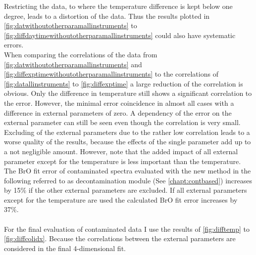 \documentclass  [
  paper    = a4,
  BCOR     = 10mm,
  twoside,
  fontsize = 12pt,
  fleqn,
  toc      = bibnumbered,
  toc      = listofnumbered,
  numbers  = noendperiod,
  headings = normal,
  listof   = leveldown,
  version  = 3.03
]                                       {scrreprt}
\begin{document}
Restricting the data, to where the temperature difference is kept below one degree, leads to a distortion of the data. Thus the results plotted in \cref{fig:datwithoutotherparamallinstruments} to \cref{fig:diffdaytimewithoutotherparamallinstruments} could also have systematic errors.\\
When comparing the correlations of the data from \cref{fig:datwithoutotherparamallinstruments} and \cref{fig:diffexptimewithoutotherparamallinstruments}  to the correlations of 
\cref{fig:datallinstruments} to \cref{fig:diffexptime} a large reduction of the correlation is obvious. Only the difference in temperature still shows a significant correlation to the   error. However, the minimal   error coincidence in almost all cases with a difference in external parameters of zero. A dependency of the   error on the external parameter can still be seen even though the correlation is very small. \\
Excluding of the external parameters due to the rather low correlation leads to a worse quality of the results, because the effects of the single parameter add up to a not negligible amount. However, note that the added impact of all external parameter except for the temperature is less important than the temperature.
The BrO fit error of contaminated spectra evaluated with the new method in the following referred to as decontamination module (See \cref{chapt:contbased}) increases by 15\% if the other external parameters are excluded. If all external parameters except for the temperature are used the calculated BrO fit error increases by 37\%.\\
\\
For the final evaluation of contaminated data I use the results of \cref{fig:difftemp} to \cref{fig:diffcolidx}. Because the correlations between the external parameters are considered in the final 4-dimensional fit.\\
\end{document}
